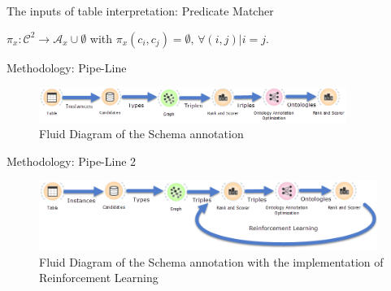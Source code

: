 \documentclass{beamer}
\begin{document}
\begin{frame}{The inputs of table interpretation: Predicate Matcher}

	\begin{definition}
		$\pi_x:\mathcal{C}^2\to \mathcal{A}_x\cup \emptyset$ with $\pi_x(c_i,c_j) =\emptyset,\, \forall (i,j)| i=j$.
	\end{definition}
\end{frame}


\begin{frame}{Methodology: Pipe-Line}
	\begin{figure}
		\includegraphics[width=10cm]{images/diagrams2.png}
		\caption{\label{fig:your-figure2} Fluid Diagram of the Schema annotation}
	\end{figure}
\end{frame}

\begin{frame}{Methodology: Pipe-Line 2}
	\begin{figure}
		\includegraphics[width=11cm]{images/diagrams.png}
		\caption{\label{fig:your-figure2} Fluid Diagram of the Schema annotation with the implementation of Reinforcement Learning}
	\end{figure}
\end{frame}

\end{document}
